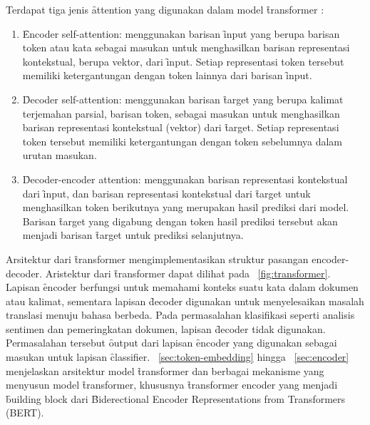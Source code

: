 	Terdapat tiga jenis \f{attention} yang digunakan dalam model \f{transformer} \citep{transformerori}:
	\begin{enumerate}
		\item \f{Encoder self-attention}: menggunakan barisan \f{input} yang berupa barisan token atau kata sebagai masukan untuk menghasilkan barisan representasi kontekstual, berupa vektor, dari \f{input}. Setiap representasi token tersebut memiliki ketergantungan dengan token lainnya dari barisan \f{input}.
		\item \f{Decoder self-attention}: menggunakan barisan \f{target} yang berupa kalimat terjemahan parsial, barisan token, sebagai masukan untuk menghasilkan barisan representasi kontekstual (vektor) dari \f{target}. Setiap representasi token tersebut memiliki ketergantungan dengan token sebelumnya dalam urutan masukan.
		\item \f{Decoder-encoder attention}: menggunakan barisan representasi kontekstual dari \f{input}, dan barisan representasi kontekstual dari \f{target} untuk menghasilkan token berikutnya yang merupakan hasil prediksi dari model. Barisan \f{target} yang digabung dengan token hasil prediksi tersebut akan menjadi barisan \f{target} untuk prediksi selanjutnya.
	\end{enumerate}
	Arsitektur dari \f{transformer} mengimplementasikan struktur pasangan encoder-decoder. Aristektur dari \f{transformer} dapat dilihat pada \pic~\ref{fig:transformer}. Lapisan \f{encoder} berfungsi untuk memahami konteks suatu kata dalam dokumen atau kalimat, sementara lapisan \f{decoder} digunakan untuk menyelesaikan masalah translasi menuju bahasa berbeda. Pada permasalahan klasifikasi seperti analisis sentimen dan pemeringkatan dokumen, lapisan \f{decoder} tidak digunakan. Permasalahan tersebut \f{output} dari lapisan \f{encoder} yang digunakan sebagai masukan untuk lapisan \f{classifier}. \sect~\ref{sec:token-embedding} hingga \sect~\ref{sec:encoder} menjelaskan arsitektur model \f{transformer} dan berbagai mekanisme yang menyusun model \f{transformer}, khususnya \f{transformer encoder} yang menjadi \f{building block} dari \f{Biderectional Encoder Representations from Transformers} (BERT).

